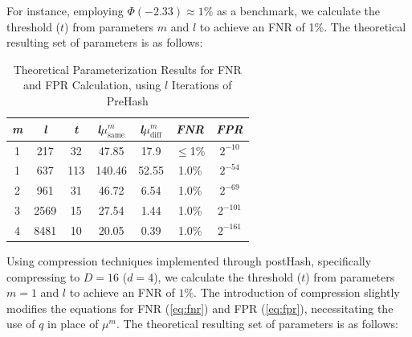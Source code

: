 For instance, employing \(\Phi(-2.33) \approx 1\%\) as a benchmark, we calculate the threshold (\(t\)) from parameters \(m\) and \(l\) to achieve an FNR of 1\%. The theoretical resulting set of parameters is as follows: 

\begin{table}[htbp] 
    \centering
    \begin{tabular}{|c|c|c|c|c|c|c|}
        \hline
        \textit{m} & \textit{l} & \textit{t} & \textit{l}\(\mu_{\text{same}}^m\) & \textit{l}\(\mu_{\text{diff}}^m\) & \textit{FNR} & \textit{FPR} \\
        \hline
        1 & 217 & 32 & 47.85 & 17.9 & \(\leq\)1\% & \(2^{-10}\)\\
        1 & 637 & 113 & 140.46 & 52.55 & 1.0\% & \(2^{-54}\) \\
        2 & 961 & 31 & 46.72 & 6.54 & 1.0\% & \(2^{-69}\) \\
        3 & 2569 & 15 & 27.54 & 1.44 & 1.0\% &\(2^{-101}\) \\
        4 & 8481 & 10 & 20.05 & 0.39 & 1.0\% & \(2^{-161}\) \\
        \hline
    \end{tabular}
    \caption{Theoretical Parameterization Results for FNR and FPR Calculation, using $l$ Iterations of PreHash}
    \label{tab:theoretical_parameterization_PreHash}
\end{table}

Using compression techniques implemented through postHash, specifically compressing to \( D = 16 \) (\( d = 4 \)), we calculate the threshold (\( t \)) from parameters \( m = 1 \) and \( l \) to achieve an FNR of \(1\%\). The introduction of compression slightly modifies the equations for FNR (\ref{eq:fnr}) and FPR (\ref{eq:fpr}), necessitating the use of \( q \) in place of \(\mu^m\). The theoretical resulting set of parameters is as follows:

